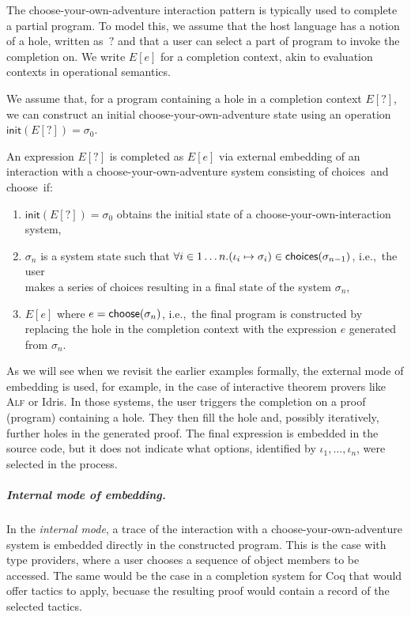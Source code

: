 \documentclass[a4paper,UKenglish,cleveref, autoref, thm-restate]{lipics-v2021}
\newcommand{\ident}[1]{\textsf{#1}}
\newcommand{\sigmaN}{\sigma_0}
\newcommand{\select}{\textnormal{\ident{choose}}}
\newcommand{\choices}{\textnormal{\ident{choices}}}
\begin{document}
The choose-your-own-adventure interaction pattern is typically used to complete a partial program.
To model this, we assume that the host language has a notion of a hole, written as~$?$
and that a user can select a part of program to invoke the completion on. We write $E[e]$ for a
completion context, akin to evaluation contexts in operational semantics.

We assume that, for a program containing a hole in a completion context $E[?]$, we can construct
an initial choose-your-own-adventure state using an operation
$\ident{init}(E[?])=\sigmaN$.

\begin{definition}\label{def:external}
An expression $E[?]$ is completed as $E[e]$ via external embedding of an interaction with
a choose-your-own-adventure system consisting of \choices\ and \select\ if:

\vspace{-0.25em}
\raggedright
\begin{enumerate}
\item $\ident{init}(E[?]) = \sigmaN$ obtains the initial state of a choose-your-own-interaction system,
\item $\sigma_n$ is a system state such that $\forall i\in{1\ldots n}.(\iota_i\mapsto\sigma_i)\in\choices{(\sigma_{n-1})}$,
  i.e.,~the user\\ makes a series of choices resulting in a final state of the system $\sigma_n$,
\item $E[e]$ where $e=\select(\sigma_n)$, i.e.,~the final program is constructed by replacing the hole
  in the completion context with the expression $e$ generated from $\sigma_n$.
\end{enumerate}
\end{definition}

As we will see when we revisit the earlier examples formally, the external mode of embedding is
used, for example, in the case of interactive theorem provers like \textsc{Alf} or Idris.
In those systems, the user triggers the completion on a proof (program) containing a hole.
They then fill the hole and, possibly iteratively, further holes in the generated proof. The final
expression is embedded in the source code, but it does not indicate what options, identified by
$\iota_1, \ldots, \iota_n$, were selected in the process.

\subparagraph{Internal mode of embedding.}
In the \emph{internal mode}, a trace of the interaction with a choose-your-own-adventure system
is embedded directly in the constructed program. This is the case with type providers, where a
user chooses a sequence of object members to be accessed. The same would be the case in a completion
system for Coq that would offer tactics to apply, becuase the resulting proof would contain a
record of the selected tactics.
\end{document}
